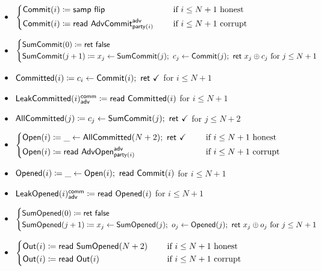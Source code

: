 \begin{itemize}
\item {\color{blue} $\begin{cases*} \Commit(i) \coloneqq \samp{\flip} & \hspace{10pt} \text{if $i \leq N+1$ honest} \\ \Commit(i) \coloneqq \read{\AdvCommit^\adv_{\party(i)}} & \hspace{10pt} \text{if $i \leq N+1$ corrupt} \end{cases*}$}
\item {\color{blue} $\begin{cases*} \SumCommit(0) \coloneqq \ret{\false} \\ \SumCommit(j+1) \coloneqq x_j \leftarrow \SumCommit(j); \ c_j \leftarrow \Commit(j); \ \ret{x_j \oplus c_j} \text{ for $j \leq N+1$} \end{cases*}$}
\item {\color{magenta} $\mathsf{Committed}(i) \coloneqq c_i \leftarrow \mathsf{Commit}(i); \ \mathsf{ret} \ \checkmark$ for $i \leq N+1$}
\item {\color{magenta} $\mathsf{LeakCommitted}(i)^{\mathsf{comm}}_{\mathsf{adv}} \coloneqq \mathsf{read} \ \mathsf{Committed}(i)$ for $i \leq N+1$}
\item {\color{magenta} $\mathsf{AllCommitted}(j) \coloneqq c_j \leftarrow \mathsf{SumCommit}(j); \ \mathsf{ret} \ \checkmark$ for $j \leq N+2$}
\item {\color{teal} $\begin{cases*} \Open(i) \coloneqq \_ \leftarrow \AllCommitted(N+2); \ \ret{\checkmark} & \hspace{10pt} \text{if $i \leq N+1$ honest} \\ \Open(i) \coloneqq \read{\AdvOpen^\adv_{\party(i)}} & \hspace{10pt} \text{if $i \leq N+1$ corrupt} \end{cases*}$}
\item {\color{red} $\mathsf{Opened}(i) \coloneqq \_ \leftarrow \mathsf{Open}(i); \ \mathsf{read} \ \mathsf{Commit}(i)$ for $i \leq N+1$}
\item {\color{red} $\mathsf{LeakOpened}(i)^{\mathsf{comm}}_{\mathsf{adv}} \coloneqq \mathsf{read} \ \mathsf{Opened}(i)$ for $i \leq N+1$}
\item {\color{red} $\begin{cases*} \SumOpened(0) \coloneqq \ret{\false} \\ \SumOpened(j+1) \coloneqq x_j \leftarrow \SumOpened(j); \ o_j \leftarrow \Opened(j); \ \ret{x_j \oplus o_j} \text{ for $j \leq N+1$} \end{cases*}$}
\item $\begin{cases*} \Out(i) \coloneqq \read{\SumOpened(N+2)} & \hspace{10pt} \text{if $i \leq N+1$ honest} \\ \Out(i) \coloneqq \read{\Out(i)} & \hspace{10pt} \text{if $i \leq N+1$ corrupt} \end{cases*}$
\end{itemize}

